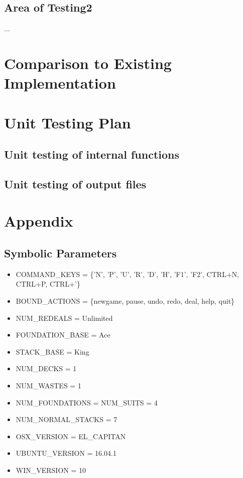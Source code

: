 \documentclass[12pt, titlepage]{article}
\begin{document}
	\subsection{Area of Testing2}
	...
	
	\section{Comparison to Existing Implementation}	
	
	\section{Unit Testing Plan}
	
	\subsection{Unit testing of internal functions}
	
	\subsection{Unit testing of output files}		
	
	
	\newpage
	\section{Appendix}

	\subsection{Symbolic Parameters}
	\begin{itemize}
			\itemsep0em
			\item COMMAND\_KEYS = \{'N', 'P', 'U', 'R', 'D', 'H', \newline 'F1', 'F2', CTRL+N,
			CTRL+P, CTRL+'\}
			\item BOUND\_ACTIONS = \{newgame, pause, undo, redo, deal, help, quit\}
			\item NUM\_REDEALS = Unlimited
			\item FOUNDATION\_BASE = Ace
			\item STACK\_BASE = King
			\item NUM\_DECKS = 1
			\item NUM\_WASTES = 1
			\item NUM\_FOUNDATIONS = NUM\_SUITS = 4
			\item NUM\_NORMAL\_STACKS = 7
			\item OSX\_VERSION = EL\_CAPITAN
			\item UBUNTU\_VERSION = 16.04.1
			\item WIN\_VERSION = 10
	\end{itemize}
\end{document}
